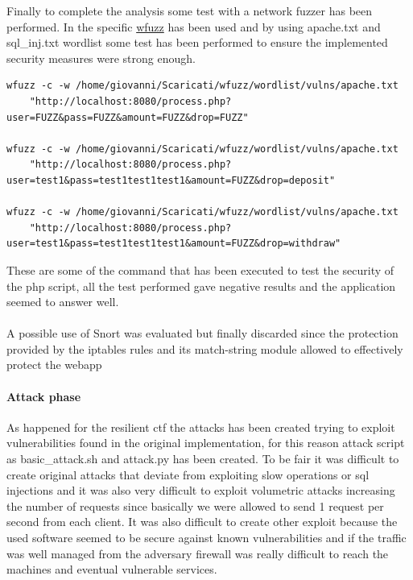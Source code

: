 \documentclass[14pt]{article}
\begin{document}
Finally to complete the analysis some test with a network fuzzer has been performed. In the specific \href{https://github.com/xmendez/wfuzz}{wfuzz} has been used and by using apache.txt and sql\_inj.txt wordlist some test has been performed to ensure the implemented security measures were strong enough. 
\begin{verbatim}
wfuzz -c -w /home/giovanni/Scaricati/wfuzz/wordlist/vulns/apache.txt 
	"http://localhost:8080/process.php?user=FUZZ&pass=FUZZ&amount=FUZZ&drop=FUZZ"

wfuzz -c -w /home/giovanni/Scaricati/wfuzz/wordlist/vulns/apache.txt 
	"http://localhost:8080/process.php?user=test1&pass=test1test1test1&amount=FUZZ&drop=deposit"

wfuzz -c -w /home/giovanni/Scaricati/wfuzz/wordlist/vulns/apache.txt 
	"http://localhost:8080/process.php?user=test1&pass=test1test1test1&amount=FUZZ&drop=withdraw"
\end{verbatim}
These are some of the command that has been executed to test the security of the php script, all the test performed gave negative results and the application seemed to answer well.
\\
\\
A possible use of Snort was evaluated but finally discarded since the protection provided by the iptables rules and its match-string module allowed to effectively protect the webapp

\paragraph{Attack phase}
As happened for the resilient ctf the attacks has been created trying to exploit vulnerabilities found in the original implementation, for this reason attack script as basic\_attack.sh and attack.py has been created. To be fair it was difficult to create original attacks that deviate from exploiting slow operations or sql injections and it was also very difficult to exploit volumetric attacks increasing the number of requests since basically we were allowed to send 1 request per second from each client. It was also difficult to create other exploit because the used software seemed to be secure against known vulnerabilities and if the traffic was well managed from the adversary firewall was really difficult to reach the machines and eventual vulnerable services.
\end{document}
